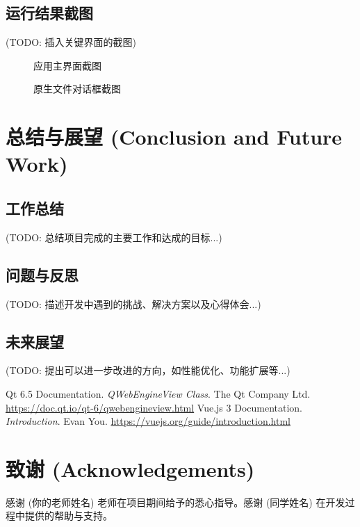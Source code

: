 \documentclass[12pt, a4paper]{article}
\begin{document}
	\subsection{运行结果截图}
	(TODO: 插入关键界面的截图)
	\begin{figure}[h]
		\centering
		\caption{应用主界面截图}
		\label{fig:screenshot1}
	\end{figure}
	
	\begin{figure}[h]
		\centering
		\caption{原生文件对话框截图}
		\label{fig:screenshot2}
	\end{figure}
	
	\section{总结与展望 (Conclusion and Future Work)}
	\subsection{工作总结}
	(TODO: 总结项目完成的主要工作和达成的目标...)
	\subsection{问题与反思}
	(TODO: 描述开发中遇到的挑战、解决方案以及心得体会...)
	\subsection{未来展望}
	(TODO: 提出可以进一步改进的方向，如性能优化、功能扩展等...)
	
	\begin{thebibliography}{9}
		 Qt 6.5 Documentation. \emph{QWebEngineView Class}. The Qt Company Ltd. \url{https://doc.qt.io/qt-6/qwebengineview.html}
		 Vue.js 3 Documentation. \emph{Introduction}. Evan You. \url{https://vuejs.org/guide/introduction.html}
	\end{thebibliography}
	
	\section*{致谢 (Acknowledgements)}
	感谢 (你的老师姓名) 老师在项目期间给予的悉心指导。感谢 (同学姓名) 在开发过程中提供的帮助与支持。
	
\end{document}
